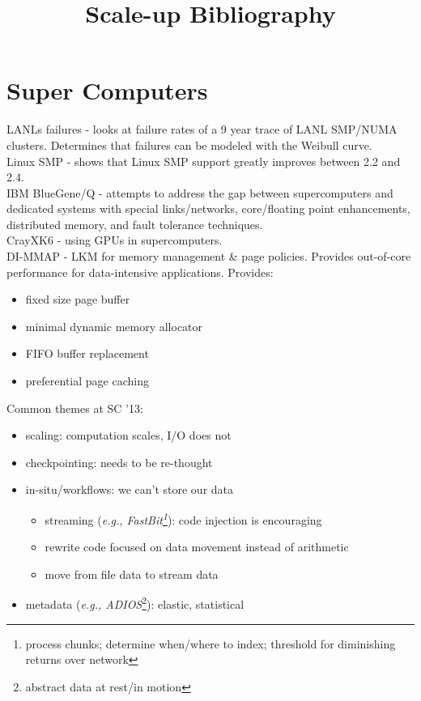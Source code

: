 \documentclass{article}
\begin{document}
\title{Scale-up Bibliography}

\maketitle


\section{Super Computers}

\noindent\cite{schroeder:2006icdsn-HPC-failures} LANLs failures - looks at failure rates of a 9 year trace of LANL SMP/NUMA clusters. Determines that failures can be modeled with the Weibull curve.\\

\noindent\cite{bryant:2000lsc-linux-smp} Linux SMP - shows that Linux SMP support greatly improves between 2.2 and 2.4.\\

\noindent\cite{gara:bim2005-blue-gene} IBM BlueGene/Q - attempts to address the gap between supercomputers and dedicated systems with special links/networks, core/floating point enhancements, distributed memory, and fault tolerance techniques. \\

\noindent\cite{feldman:website2011-cray} CrayXK6 - using GPUs in supercomputers. \\

\noindent\cite{van-essen:DISCS2012-DI-MMAP} DI-MMAP - LKM for memory management \& page policies.  Provides out-of-core performance for data-intensive applications. Provides: 
\begin{itemize}
	\item fixed size page buffer
	\item minimal dynamic memory allocator
	\item FIFO buffer replacement
	\item preferential page caching 
\end{itemize}

\noindent Common themes at SC '13:
\begin{itemize}
	\item scaling: computation scales, I/O does not
	\item checkpointing: needs to be re-thought
	\item in-situ/workflows: we can't store our data
		\begin{itemize}
			\item streaming ({\it e.g.,  FastBit\footnote{process chunks; determine when/where to index; threshold for diminishing returns over network}}): code injection is encouraging
			\item rewrite code focused on data movement instead of arithmetic
			\item move from file data to stream data
		\end{itemize}
	\item metadata ({\it e.g., ADIOS}\footnote{abstract data at rest/in motion}): elastic, statistical
\end{itemize}
\end{document}
